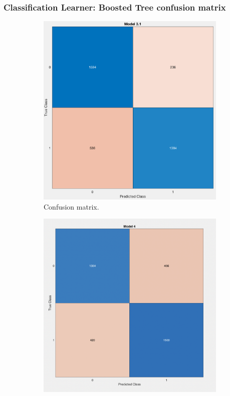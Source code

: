 \documentclass{beamer}
\begin{document}
\begin{frame}
    \frametitle{Classification Learner: Boosted Tree confusion matrix}
    \begin{figure}  
        \centering
        \begin{subfigure}[t]{0.48\textwidth}
            \centering
            \includegraphics[width=\textwidth]{cl_1_confusion}
            \caption{Confusion matrix.}
        \end{subfigure}
        \hfill
        \begin{subfigure}[t]{0.48\textwidth}
            \centering
            \includegraphics[width=\textwidth]{cl_1_confusion_penalized}

\end{subfigure}
\end{figure}
\end{frame}
\end{document}
